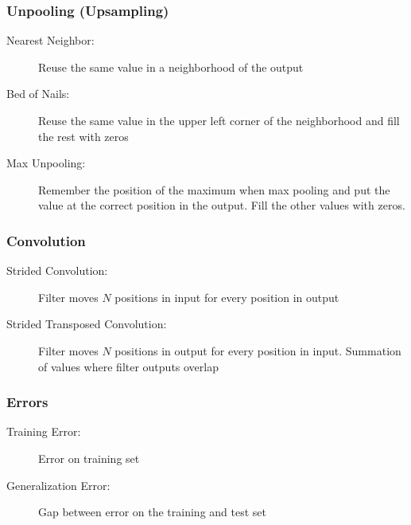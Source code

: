 \subsubsection{Unpooling (Upsampling)}
\begin{description}
    \item[Nearest Neighbor:] Reuse the same value in a neighborhood of the output
    \item[Bed of Nails:] Reuse the same value in the upper left corner of the neighborhood and fill the rest with zeros
    \item[Max Unpooling:] Remember the position of the maximum when max pooling and put the value at the correct position in the output. Fill the other values with zeros.
\end{description}

\subsubsection{Convolution}
\begin{description}
    \item[Strided Convolution:] Filter moves $N$ positions in input for every position in output
    \item[Strided Transposed Convolution:] Filter moves $N$ positions in output for every position in input. Summation of values where filter outputs overlap
\end{description}

\subsubsection{Errors}
\begin{description}
    \item[Training Error:] Error on training set
    \item[Generalization Error:] Gap between error on the training and test set
\end{description}

